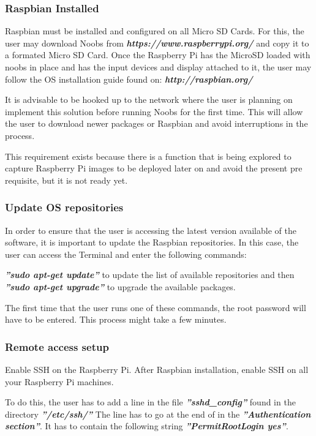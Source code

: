 \documentclass[sigconf]{acmart}
\begin{document}
	\subsubsection{Raspbian Installed}
	Raspbian must be installed and configured on all Micro SD Cards.
	For this, the user may download Noobs from 	\textbf{\textit{https://www.raspberrypi.org/}} and copy it to a formated Micro SD Card.
	Once the Raspberry Pi has the MicroSD loaded with noobs in place and has the input devices and display attached to it, the user may follow the OS installation guide found on: \textbf{\textit{http://raspbian.org/}}
	
	It is advisable to be hooked up to the network where the user is planning on implement this solution before running Noobs for the first time. This will allow the user to download newer packages or Raspbian and avoid interruptions in the process.	
		
	This requirement exists because there is a function that is being explored to capture Raspberry Pi images to be deployed later on and avoid the present pre requisite, but it is not ready yet.
	
	\subsubsection{Update OS repositories}
	In order to ensure that the user is accessing the latest version available of the software, it is important to update the Raspbian repositories. 
	In this case, the user can access the Terminal and enter the following commands:
	
		\textbf{\textit{''sudo apt-get update''}} to update the list of available repositories
	and then 	\textbf{\textit{''sudo apt-get upgrade''}} to upgrade the available packages.
	
	The first time that the user runs one of these commands, the root password will have to be entered.
	This process might take a few minutes. \cite{debianpackage}
	
	\subsubsection{Remote access setup}
	Enable SSH on the Raspberry Pi.
	After Raspbian installation, enable SSH on all your Raspberry Pi machines. 
	
	To do this, the user has to add a line in the file \textbf{\textit{''sshd\_config''}} found in the directory \textbf{\textit{''/etc/ssh/''}} 
	The line has to go at the end of in the \textbf{\textit{''Authentication section''}}. 
	It has to contain the following string \textbf{\textit{''PermitRootLogin yes''}}.
	\cite{rootSsh}
	
\end{document}
